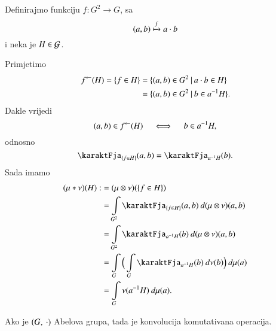 \begin{nap} \label{nap:7.12-1}
    Definirajmo funkciju $f : G^2 \to G$, sa
    \begin{equation*}
        (a, b) \xmapsto{f} a \cdot b
    \end{equation*}
    i neka je $H \in \mathcal{G}$.

    Primjetimo
    \begin{equation*}
        \begin{aligned}
            {f}^{\leftarrow} (H) = \{f \in H \} &= \{{(a, b) \in G^2} \: | \: {a \cdot b \in H}\}\\
            &= \{{(a, b) \in G^2} \: | \: {b \in a^{-1} H}\}.
        \end{aligned}
    \end{equation*}
    Dakle vrijedi
    \begin{equation*}
        (a, b) \in {f}^{\leftarrow} (H) \quad \iff \quad b \in a^{-1} H,
    \end{equation*}
    odnosno
    \begin{equation}    \label{jed:7.12-2}
        \karaktFja_{ \{ f \in H \} } (a, b) = \karaktFja_{a^{-1} H} (b).
    \end{equation}
    Sada imamo
    \begin{equation*}
        \begin{aligned}
            (\mu * \nu) (H) :&= (\mu \otimes \nu) (\{ f \in H \})\\
            &= \int\limits_{G^2} \karaktFja_{\{ f \in H \}} (a, b) \: d (\mu \otimes \nu) (a, b)\\
            &= \int\limits_{G^2} \karaktFja_{ a^{-1} H } (b) \: d (\mu \otimes \nu) (a, b)\\
            &= \int\limits_G \Big( \int\limits_G \karaktFja_{a^{-1} H} (b) \: d \nu (b) \Big) \: d \mu (a)\\
            &= \int\limits_G \nu (a^{-1} H) \: d \mu (a). 
        \end{aligned}
    \end{equation*}
\end{nap}

\begin{zad} \label{zad:7.13}
    Ako je $({G}, \: {\cdot})$ Abelova grupa, tada je konvolucija komutativana operacija.
\end{zad}

